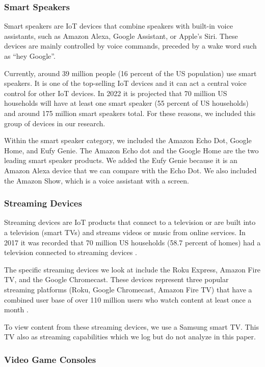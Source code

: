 \subsubsection{Smart Speakers}
\label{Smart Speakers}

Smart speakers are IoT devices that combine speakers with built-in voice assistants, such as Amazon Alexa, Google Assistant, or Apple's Siri. These devices are mainly controlled by voice commands, preceded by a wake word such as ``hey Google''.

Currently, around 39 million people (16 percent of the US population) use smart speakers\cite{perez_2017}. It is one of the top-selling IoT devices and it can act a central voice control for other IoT devices. In 2022 it is projected that 70 million US households will have at least one smart speaker (55 percent of US households) and around 175 million smart speakers total\cite{perez_2018}. For these reasons, we included this group of devices in our research.

Within the smart speaker category, we included the Amazon Echo Dot, Google Home, and Eufy Genie. The Amazon Echo dot and the Google Home are the two leading smart speaker products. We added the Eufy Genie because it is an Amazon Alexa device that we can compare with the Echo Dot. We also included the Amazon Show, which is a voice assistant with a screen.

\subsubsection{Streaming Devices}

Streaming devices are IoT products that connect to a television or are built into a television (smart TVs) and streams videos or music from online services. In 2017 it was recorded that 70 million US households (58.7 percent of homes) had a television connected to streaming devices \cite{lynch_2017}.

The specific streaming devices we look at include the Roku Express, Amazon Fire TV, and the Google Chromecast. These devices represent three popular streaming platforms (Roku, Google Chromecast, Amazon Fire TV) that have a combined user base of over 110 million users who watch content at least once a month \cite{emarketer_2017}.

To view content from these streaming devices, we use a Samsung smart TV. This TV also as streaming capabilities which we log but do not analyze in this paper.

\subsubsection{Video Game Consoles}

